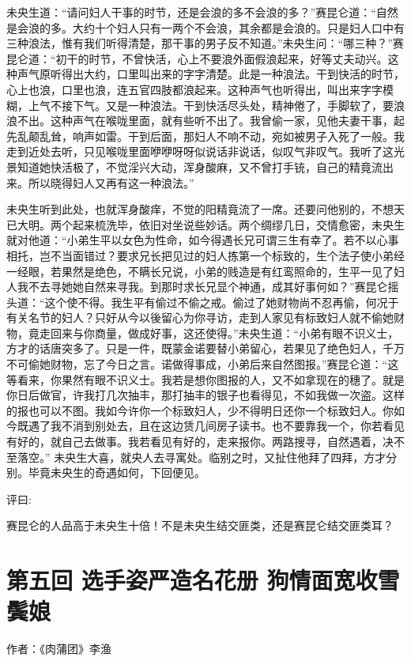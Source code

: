 \documentclass[a4paper,12pt,UTF8,twoside]{ctexbook}
\begin{document}
未央生道：“请问妇人干事的时节，还是会浪的多不会浪的多？”赛昆仑道：“自然是会浪的多。大约十个妇人只有一两个不会浪，其余都是会浪的。只是妇人口中有三种浪法，惟有我们听得清楚，那干事的男子反不知道。”未央生问：“哪三种？”赛昆仑道：“初干的时节，不曾快活，心上不要浪外面假浪起来，好等丈夫动兴。这种声气原听得出大约，口里叫出来的字字清楚。此是一种浪法。干到快活的时节，心上也浪，口里也浪，连五官四肢都浪起来。这种声气也听得出，叫出来字字模糊，上气不接下气。又是一种浪法。干到快活尽头处，精神倦了，手脚软了，要浪浪不出。这种声气在喉咙里面，就有些听不出了。我曾偷一家，见他夫妻干事，起先乱颠乱耸，响声如雷。干到后面，那妇人不响不动，宛如被男子入死了一般。我走到近处去听，只见喉咙里面咿咿呀呀似说话非说话，似叹气非叹气。我听了这光景知道她快活极了，不觉淫兴大动，浑身酸麻，又不曾打手铳，自己的精竟流出来。所以晓得妇人又再有这一种浪法。”

未央生听到此处，也就浑身酸痒，不觉的阳精竟流了一席。还要问他别的，不想天已大明。两个起来梳洗毕，依旧对坐说些妙话。两个绸缪几日，交情愈密，未央生就对他道：“小弟生平以女色为性命，如今得遇长兄可谓三生有幸了。若不以心事相托，岂不当面错过？要求兄长把见过的妇人拣第一个标致的，生个法子使小弟经一经眼，若果然是绝色，不瞒长兄说，小弟的贱造是有红鸾照命的，生平一见了妇人我不去寻她她自然来寻我。到那时求长兄显个神通，成其好事何如？”赛昆仑摇头道：“这个使不得。我生平有偷过不偷之戒。偷过了她财物尚不忍再偷，何况于有关名节的妇人？只好从今以後留心为你寻访，走到人家见有标致妇人就不偷她财物，竟走回来与你商量，做成好事，这还使得。”未央生道：“小弟有眼不识义士，方才的话唐突多了。只是一件，既蒙金诺要替小弟留心，若果见了绝色妇人，千万不可偷她财物，忘了今日之言。诺做得事成，小弟后来自然图报。”赛昆仑道：“这等看来，你果然有眼不识义士。我若是想你图报的人，又不如拿现在的穗了。就是你日后做官，许我打几次抽丰，那打抽丰的银子也看得见，不如我做一次盗。这样的报也可以不图。我如今许你一个标致妇人，少不得明日还你一个标致妇人。你如今既遇了我不消到别处去，且在这边赁几间房子读书。也不要靠我一个，你若看见有好的，就自己去做事。我若看见有好的，走来报你。两路搜寻，自然遇着，决不至落空。” 未央生大喜，就央人去寻寓处。临别之时，又扯住他拜了四拜，方才分别。毕竟未央生的奇遇如何，下回便见。

评曰:

赛昆仑的人品高于未央生十倍！不是未央生结交匪类，还是赛昆仑结交匪类耳？

\chapter{第五回 选手姿严造名花册 狗情面宽收雪鬓娘}

作者：《肉蒲团》李渔
\end{document}
